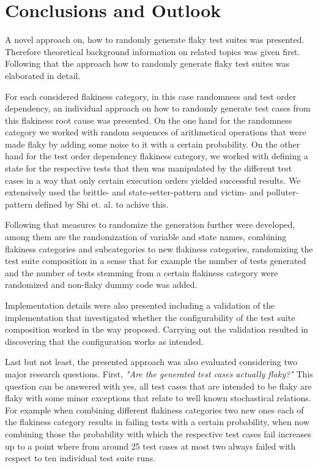 \documentclass[
fancyheadings, %
%
%
]{stsreprt}
\begin{document}
\chapter{Conclusions and Outlook}\label{ch:conc-futher-work}
A novel approach on, how to randomly generate flaky test suites was presented. 
Therefore theoretical background information on related topics was given first. 
Following that the approach how to randomly generate flaky test suites was elaborated in detail. \par
For each considered flakiness category, in this case randomness and test order dependency, an individual approach on how to randomly generate test cases from this flakiness root cause was presented. 
On the one hand for the randomness category we worked with random sequences of arithmetical operations that were made flaky by adding some noise to it with a certain probability. 
On the other hand for the test order dependency flakiness category, we worked with defining a state for the respective tests that then was manipulated by the different test cases in a way that only certain execution orders yielded successful results. 
We extensively used the brittle- and state-setter-pattern and victim- and polluter-pattern defined by Shi et. al. \cite{ifixflakies:2019} to achive this. \par
Following that measures to randomize the generation further were developed, among them are the randomization of variable and state names, combining flakiness categories and subcategories to new flakiness categories, randomizing the test suite composition in a sense that for example the number of tests generated and the number of tests stemming from a certain flakiness category were randomized and non-flaky dummy code was added. \par
Implementation details were also presented including a validation of the implementation that investigated whether the configurability of the test suite composition worked in the way proposed. 
Carrying out the validation resulted in discovering that the configuration works as intended. \par
Last but not least, the presented approach was also evaluated considering two major research questions.
First, \textit{"Are the generated test cases actually flaky?"}
This question can be answered with yes, all test cases that are intended to be flaky are flaky with some minor exceptions that relate to well known stochastical relations. 
For example when combining different flakiness categories two new ones each of the flakiness category results in failing tests with a certain probability, when now combining those the probability with which the respective test cases fail increases up to a point where from around 25 test cases at most two always failed with respect to ten individual test suite runs. \par
\end{document}
